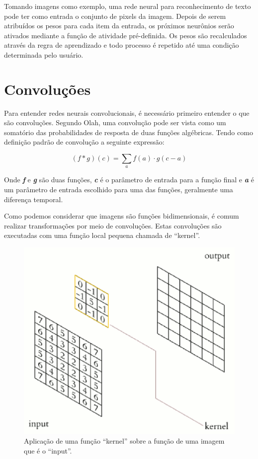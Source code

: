 Tomando imagens como exemplo, uma rede neural para reconhecimento de
texto pode ter como entrada o conjunto de pixels da imagem. Depois de
serem atribuídos os pesos para cada item da entrada, os próximos
neurônios serão ativados mediante a função de atividade
pré-definida. Os pesos são recalculados através da regra de
aprendizado e todo processo é repetido até uma condição determinada
pelo usuário.

\section{Convoluções}

Para entender redes neurais convolucionais, é necessário primeiro
entender o que são convoluções. Segundo Olah\cite{Olah}, uma
convolução pode ser vista como um somatório das probabilidades de
resposta de duas funções algébricas. Tendo como definição padrão de
convolução a seguinte expressão:

\begin{equation}
   (f*g)(c) = \sum\limits_{a}f(a)\cdot g(c-a)
\end{equation}

Onde {\bf \emph{f}} e {\bf \emph{g}} são duas funções, {\bf \emph{c}}
é o parâmetro de entrada para a função final e {\bf \emph{a}} é um
parâmetro de entrada escolhido para uma das funções, geralmente uma
diferença temporal.

Como podemos considerar que imagens são funções bidimensionais, é
comum realizar transformações por meio de convoluções. Estas
convoluções são executadas com uma função local pequena chamada de
``kernel''.

\begin{figure}[H]
\centering
\includegraphics[scale=0.6]{imagens/fig1.eps}
\caption{Aplicação de uma função ``kernel'' sobre a função de uma
  imagem que é o ``input''.}
\label{fig:convolution_kernel}
\end{figure}

